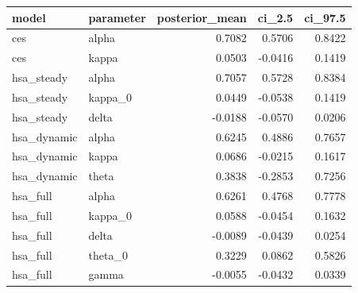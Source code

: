 \begin{tabular}{llrrr}
\toprule
model & parameter & posterior\_mean & ci\_2.5 & ci\_97.5 \\
\midrule
ces & alpha & 0.7082 & 0.5706 & 0.8422 \\
ces & kappa & 0.0503 & -0.0416 & 0.1419 \\
hsa\_steady & alpha & 0.7057 & 0.5728 & 0.8384 \\
hsa\_steady & kappa\_0 & 0.0449 & -0.0538 & 0.1419 \\
hsa\_steady & delta & -0.0188 & -0.0570 & 0.0206 \\
hsa\_dynamic & alpha & 0.6245 & 0.4886 & 0.7657 \\
hsa\_dynamic & kappa & 0.0686 & -0.0215 & 0.1617 \\
hsa\_dynamic & theta & 0.3838 & -0.2853 & 0.7256 \\
hsa\_full & alpha & 0.6261 & 0.4768 & 0.7778 \\
hsa\_full & kappa\_0 & 0.0588 & -0.0454 & 0.1632 \\
hsa\_full & delta & -0.0089 & -0.0439 & 0.0254 \\
hsa\_full & theta\_0 & 0.3229 & 0.0862 & 0.5826 \\
hsa\_full & gamma & -0.0055 & -0.0432 & 0.0339 \\
\bottomrule
\end{tabular}

